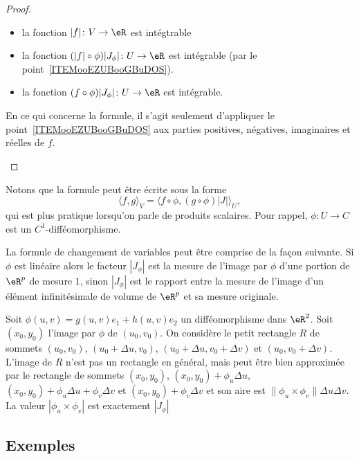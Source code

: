 \begin{proof}
\begin{enumerate}
\begin{itemize}
			      \item la fonction \( | f |\colon V\to \eR\) est intégtrable
			      \item la fonction \( (| f |\circ\phi)| J_{\phi} |\colon U\to \eR\) est intégrable (par le point~\ref{ITEMooEZUBooGBuDOS}).
			      \item la fonction \( (f\circ\phi)| J_{\phi} |\colon U\to \eR\) est intégrable.
		      \end{itemize}
		      En ce qui concerne la formule, il s'agit seulement d'appliquer le point~\ref{ITEMooEZUBooGBuDOS} aux parties positives, négatives, imaginaires et réelles de \( f\).
	\end{enumerate}
\end{proof}

Notons que la formule peut être écrite sous la forme
\begin{equation}        \label{EQooQKARooELPCFO}
	\langle f, g\rangle_V=\langle f\circ\phi, (g\circ\phi)| J |\rangle_U,
\end{equation}
qui est plus pratique lorsqu'on parle de produits scalaires. Pour rappel, \( \phi\colon U\to C\) est un \( C^1\)-difféomorphisme.

\begin{normaltext}
	La formule de changement de variables peut être comprise de la façon suivante. Si $\phi$ est linéaire  alors le facteur $|J_{\phi}|$ est la mesure de l'image par $\phi$ d'une portion de $\eR^p$ de mesure $1$, sinon  $|J_{\phi}|$ est le rapport entre la mesure de l'image d'un élément infinitésimale de volume de $\eR^p$ et sa mesure originale.

	Soit $\phi(u,v)=g(u,v)e_1+h(u,v)e_2$ un difféomorphisme dans $\eR^2$. Soit $(x_0, y_0)$ l'image par $\phi$ de $(u_0,v_0)$. On considère le petit rectangle $R$ de sommets $(u_0,v_0)$, $(u_0+\Delta u,v_0)$, $(u_0+\Delta u,v_0+\Delta v)$ et $(u_0,v_0+\Delta v)$. L'image de $R$ n'est pas un rectangle en général, mais peut être bien approximée par le rectangle de sommets $(x_0,y_0)$, $(x_0 ,y_0)+ \phi_{u}\Delta u$, $(x_0 ,y_0)+\phi_{u}\Delta u +\phi_{v}\Delta v$ et  $(x_0 ,y_0)+ \phi_{v}\Delta v$ et son aire est $\| \phi_{u}\times \phi_{v}\| \Delta u\Delta v$. La valeur $|\phi_{u}\times \phi_{v}|$ est exactement $|J_{\phi}|$
\end{normaltext}

\subsection{Exemples}

